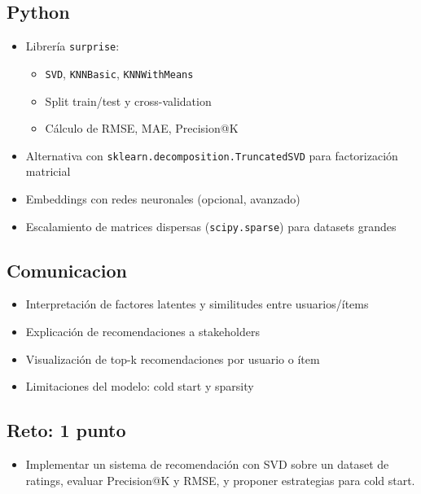 \documentclass[12pt,a4paper,openany,oneside]{book}
\begin{document}
\begin{itemize}
\subsection{Python}
\begin{itemize}
    \item Librería \texttt{surprise}:
    \begin{itemize}
        \item \texttt{SVD}, \texttt{KNNBasic}, \texttt{KNNWithMeans}
        \item Split train/test y cross-validation
        \item Cálculo de RMSE, MAE, Precision@K
    \end{itemize}
    \item Alternativa con \texttt{sklearn.decomposition.TruncatedSVD} para factorización matricial
    \item Embeddings con redes neuronales (opcional, avanzado)
    \item Escalamiento de matrices dispersas (\texttt{scipy.sparse}) para datasets grandes
\end{itemize}

\subsection{Comunicacion}
\begin{itemize}
    \item Interpretación de factores latentes y similitudes entre usuarios/ítems
    \item Explicación de recomendaciones a stakeholders
    \item Visualización de top-k recomendaciones por usuario o ítem
    \item Limitaciones del modelo: cold start y sparsity
\end{itemize}

\subsection{Reto: 1 punto}
\begin{itemize}
    \item Implementar un sistema de recomendación con SVD sobre un dataset de ratings, evaluar Precision@K y RMSE, y proponer estrategias para cold start.
\end{itemize}


\end{itemize}
\end{document}
